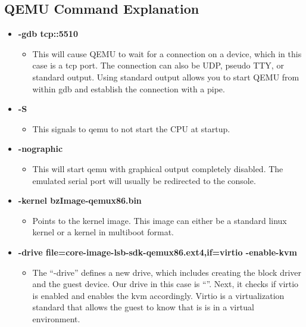 \documentclass[10pt,onecolumn,draftclsnofoot]{IEEEtran} %
\begin{document}
\begin{singlespace}
\newpage
\section{\bf  QEMU Command Explanation}

  \begin{itemize}
    \item \textbf{-gdb tcp::5510}
    \begin{itemize}
      \item This will cause QEMU to wait for a connection on a device, which in this case is a tcp port. The connection can also be UDP, pseudo TTY, or standard output. Using standard output allows you to start QEMU from within gdb and establish the connection with a pipe.
    \end{itemize}

    \item \textbf{-S}
    \begin{itemize}
      \item This signals to qemu to not start the CPU at startup.
    \end{itemize}

    \item \textbf{-nographic}
    \begin{itemize}
      \item This will start qemu with graphical output completely disabled. The emulated serial port will usually be redirected to the console.
    \end{itemize}

    \item \textbf{-kernel bzImage-qemux86.bin}
    \begin{itemize}
      \item  Points to the kernel image. This image can either be a standard linux kernel or a kernel in multiboot format.
    \end{itemize}

    \item \textbf{-drive file=core-image-lsb-sdk-qemux86.ext4,if=virtio -enable-kvm}
    \begin{itemize}
      \item The “-drive” defines a new drive, which includes creating the block driver and the guest device. Our drive in this case is “”.  Next, it checks if virtio is enabled and enables the kvm accordingly. Virtio is a virtualization standard that allows the guest to know that is is in a virtual environment.
    \end{itemize}


\end{itemize}
\end{singlespace}
\end{document}

